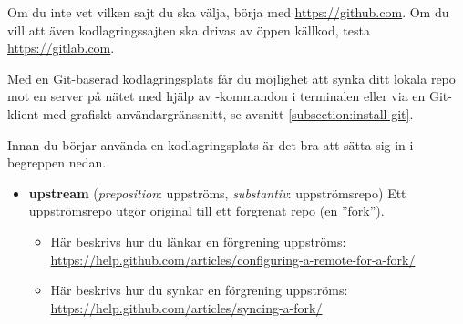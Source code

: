 Om du inte vet vilken sajt du ska välja, börja med \url{https://github.com}. Om du vill att även kodlagringssajten ska drivas av öppen källkod, testa \url{https://gitlab.com}.

Med en Git-baserad kodlagringsplats får du möjlighet att synka ditt lokala repo mot en server på nätet med hjälp av -kommandon i terminalen eller via en Git-klient med grafiskt användargränssnitt, se avsnitt \ref{subsection:install-git}. 

Innan du börjar använda en kodlagringsplats är det bra att sätta sig in i begreppen nedan.

\begin{itemize}
 Genom att klona ett repo som ligger på en nätlagringsplats kan du bygga, undersöka och vidareutveckla koden lokalt på din dator. Om du har rättigheter att lämna in kod till det centrala originalet kan du pusha dina commits direkt via terminalkommando eller Git-klient.

 Genom att förgrena ett repo skapar du en kopia, normalt även den nätlagrad på en kodlagringsplats, som du kan utveckla separat från originalet. Det blir då möjligt för dig att lämna in ändringar och trycka upp dem, även om du inte har rättigheter att leverera (''pusha'') till originalet. Gör en ändringsbegäran (Pull Request, PR) om du vill bidra med dina ändringar, så kan ägaren av originalet sedan välja att sammanfoga (''merga'') dina ändringar med originalet. Många nätlagringsplatser, så som GitHub, har en speciell knapp som du trycker på för att enkelt skapa en fork av ett repo under din användare. 

\item \textbf{upstream} (\textit{preposition}: uppströms, \textit{substantiv}: uppströmsrepo) Ett uppströmsrepo utgör original till ett förgrenat repo (en ''fork''). 
\begin{itemize}[noitemsep,nolistsep]

\item Här beskrivs hur du länkar en förgrening uppströms: \\ 
{\small\url{https://help.github.com/articles/configuring-a-remote-for-a-fork/}}

\item Här beskrivs hur du synkar en förgrening uppströms:\\
{\small\url{https://help.github.com/articles/syncing-a-fork/}}

\end{itemize}

\end{itemize}

